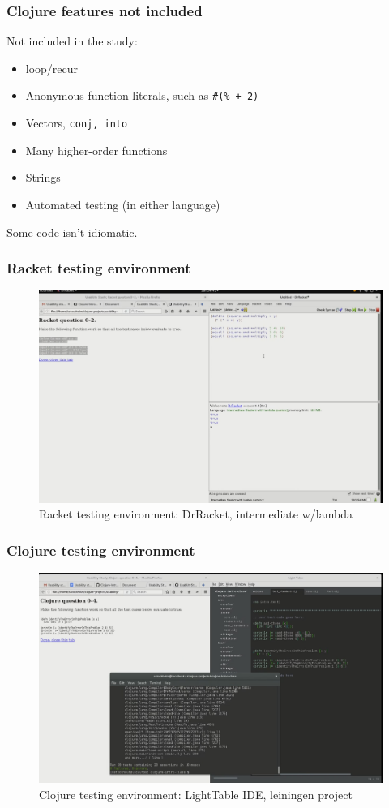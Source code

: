 \documentclass{beamer}
\begin{document}
\begin{frame}
\frametitle{ Clojure features not included}
Not included in the study:
\begin{itemize}
\item loop/recur
\item Anonymous function literals, such as {\tt \#(\% + 2)}
\item Vectors, {\tt conj, into} 
\item Many higher-order functions
\item Strings 
\item Automated testing (in either language)
\end{itemize}
Some code isn't idiomatic. 
\end{frame}

\begin{frame}
\frametitle{Racket testing environment}
\begin{figure}
\includegraphics[height=0.75\textheight]{RacketEnvironment.png}
\caption{Racket testing environment: DrRacket,  intermediate w/lambda}
\end{figure}
\end{frame}


\begin{frame}
\frametitle{Clojure testing environment}
\begin{figure}
\includegraphics[height=0.75\textheight]{ClojureEnvironment.png}
\caption{Clojure testing environment: LightTable IDE, leiningen project }
\end{figure}
\end{frame}
\end{document}
